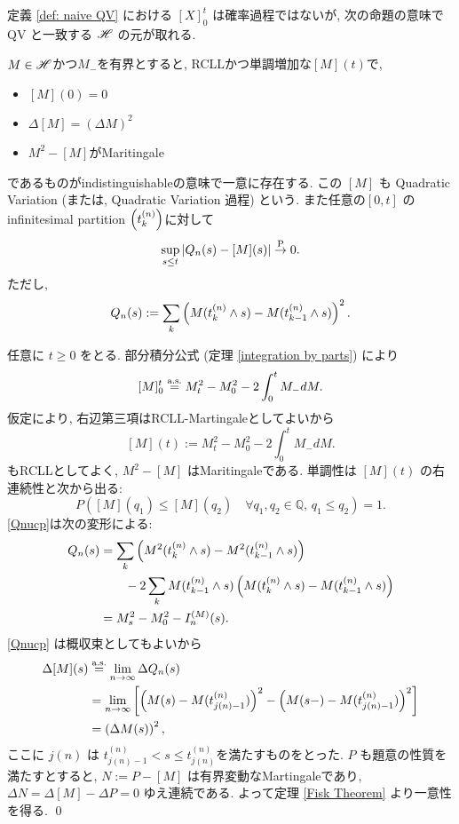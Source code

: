 \documentclass{ltjsarticle}
\begin{document}
定義 \ref{def: naive QV} における \( [X]_0^{t} \) は確率過程ではないが, 次の命題の意味で QV と一致する \( \mathscr{H} \) の元が取れる.
\begin{prp} \label{doob-mayer1}
	\( M \in \mathscr{H} \)かつ\( M_{-} \)を有界とすると, RCLLかつ単調増加な\( [M](t) \)で, 
	\begin{itemize}
		\item	\( [M](0) = 0 \)
		\item	\( \Delta [M] = ( \Delta M )^2 \)
		\item	\( M^2 - [M] \)がMaritingale
	\end{itemize}
	であるものがindistinguishableの意味で一意に存在する.
	この \( [M] \) も Quadratic Variation (または, Quadratic Variation 過程) という.
	また任意の\( [0,t] \) のinfinitesimal partition \( \left( t_k^{(n)} \right) \)に対して
	\begin{equation}		\label{Qnucp}
		\sup_{ s \le t }| Q_n(s)-[M](s) | \stackrel{ \mathrm{P} }{ \to } 0.
	\end{equation}
	ただし, 
	\[
		Q_n(s) := \sum_k \left(M ( t_k^{(n)} \wedge s ) - M ( t_{k-1}^{(n)} \wedge s ) \right)^2.
	\]
\end{prp}
\begin{prf}
	任意に \( t \ge 0 \) をとる. 部分積分公式 (定理 \ref{integration by parts}) により
	\[
		[M]_0^t \stackrel{ \text{a.s.} }{ = } M_t^2 - M_0^2 - 2\int_0^t M_{-} dM.
	\]
	仮定により, 右辺第三項はRCLL-Martingaleとしてよいから
	\[
		[M](t) := M_t^2 - M_0^2 - 2\int_0^t M_{-} dM.
	\]
	もRCLLとしてよく, \( M^2 - [M] \) はMaritingaleである.
	単調性は \( [M](t) \) の右連続性と次から出る:
	\[
		P \left( [M](q_1) \le [M](q_2)
		\quad \forall q_1,q_2 \in \mathbb{Q},\, q_1 \le q_2 \right) = 1.
	\]
	\eqref{Qnucp}は次の変形による:
	\begin{align*}
		Q_n(s) & =	\sum_k \left(M^2( t_k^{(n)} \wedge s ) - M^2( t_{k-1}^{(n)} \wedge s ) \right)
		\\
		       & \quad \quad - 2 \sum_k M ( t_{k-1}^{(n)} \wedge s )
		\left( M( t_k^{(n)} \wedge s ) - M( t_{k-1}^{(n)} \wedge s ) \right)
		\\
		       & =	M_s^2 - M_0^2 - I_n^{ (M) }(s).
	\end{align*}
	\eqref{Qnucp} は概収束としてもよいから
	\begin{equation}
		\begin{aligned}
			\Delta[M](s) & \stackrel{ \text{a.s.} }{ = }\lim_{ n \to \infty } \Delta Q_n(s)                                                                                                  \\
			             & =	\lim_{ n \to \infty } \left[ \left( M(s) - M( t_{ j(n)-1 }^{(n)} ) \right)^2 - \left( M(s-) - M( t_{ j(n)-1 }^{(n)} ) \right)^2 \right] \\
			             & =	\left(\Delta M(s) \right)^2,
		\end{aligned}
	\end{equation}
	ここに \( j(n) \) は \( t_{ j(n)-1 }^{(n)} < s \le t_{ j(n) }^{(n)} \)を満たすものをとった. 
	\( P \) も題意の性質を満たすとすると, 
	\( N := P - [M] \) は有界変動なMartingaleであり, 
	\( \Delta N = \Delta [M] - \Delta P = 0 \) ゆえ連続である.
	よって定理 \ref{Fisk Theorem} より一意性を得る.
	\qed\end{prf}	%
\end{document}
